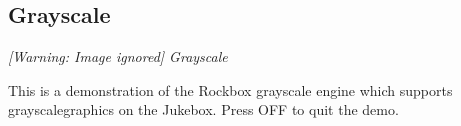 \subsection{Grayscale}
{\centering\itshape
  [Warning: Image ignored] %
 \newline
Grayscale
\par}

This is a demonstration of the Rockbox grayscale engine which supports grayscalegraphics on the Jukebox.  Press OFF to quit the demo.


